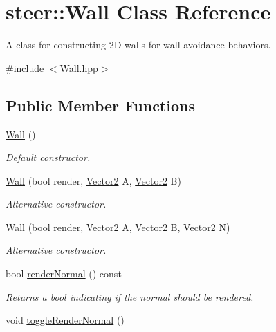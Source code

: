 \hypertarget{classsteer_1_1_wall}{\section{steer\-:\-:Wall Class Reference}
\label{classsteer_1_1_wall}
}


A class for constructing 2\-D walls for wall avoidance behaviors.  




{\ttfamily \#include $<$Wall.\-hpp$>$}

\subsection*{Public Member Functions}
\begin{DoxyCompactItemize}
\item 
\hypertarget{classsteer_1_1_wall_ae2c863200e4d2bb7a4d714db57f6a416}{\hyperlink{classsteer_1_1_wall_ae2c863200e4d2bb7a4d714db57f6a416}{Wall} ()}\label{classsteer_1_1_wall_ae2c863200e4d2bb7a4d714db57f6a416}

\begin{DoxyCompactList}\small\item\em Default constructor. \end{DoxyCompactList}\item 
\hyperlink{classsteer_1_1_wall_a7e552a582befa801f36c1727f336b478}{Wall} (bool render, \hyperlink{structsteer_1_1_vector2}{Vector2} A, \hyperlink{structsteer_1_1_vector2}{Vector2} B)
\begin{DoxyCompactList}\small\item\em Alternative constructor. \end{DoxyCompactList}\item 
\hyperlink{classsteer_1_1_wall_a599ee31c51412e606b8ffc74bb8aea6f}{Wall} (bool render, \hyperlink{structsteer_1_1_vector2}{Vector2} A, \hyperlink{structsteer_1_1_vector2}{Vector2} B, \hyperlink{structsteer_1_1_vector2}{Vector2} N)
\begin{DoxyCompactList}\small\item\em Alternative constructor. \end{DoxyCompactList}\item 
\hypertarget{classsteer_1_1_wall_a83256ab24d0d9d27916d83d06c2f7cde}{bool \hyperlink{classsteer_1_1_wall_a83256ab24d0d9d27916d83d06c2f7cde}{render\-Normal} () const }\label{classsteer_1_1_wall_a83256ab24d0d9d27916d83d06c2f7cde}

\begin{DoxyCompactList}\small\item\em Returns a bool indicating if the normal should be rendered. \end{DoxyCompactList}\item 
\hypertarget{classsteer_1_1_wall_a7413071476c1a527587fa8e452f46d3d}{void \hyperlink{classsteer_1_1_wall_a7413071476c1a527587fa8e452f46d3d}{toggle\-Render\-Normal} ()}\label{classsteer_1_1_wall_a7413071476c1a527587fa8e452f46d3d}


\end{DoxyCompactItemize}
